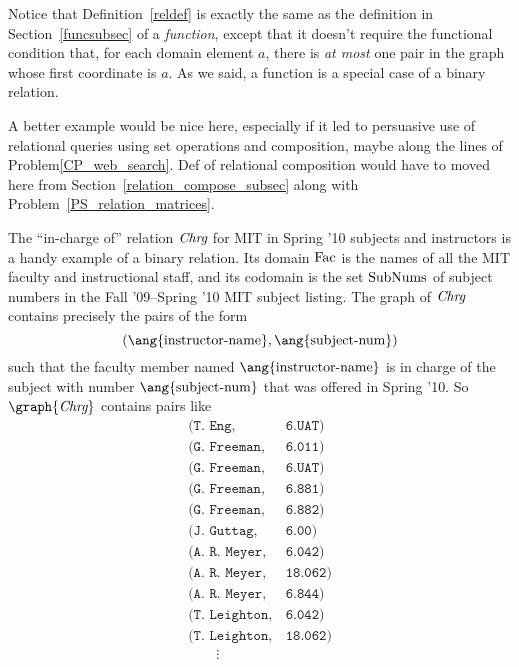 Notice that Definition~\ref{reldef} is exactly the same as the definition
in Section~\ref{funcsubsec} of a \emph{function}, except that it doesn't
require the functional condition that, for each domain element $a$, there
is \emph{at most} one pair in the graph whose first coordinate is $a$.  As
we said, a function is a special case of a binary relation.

\begin{editingnotes}
A better example would be nice here, especially if it led to
persuasive use of relational queries using set operations and
composition, maybe along the lines of Problem\ref{CP_web_search}.
Def of relational composition would have to moved here from
Section~\ref{relation_compose_subsec} along with
Problem~\ref{PS_relation_matrices}.
\end{editingnotes}

The ``in-charge of'' relation $\textit{Chrg}$ for MIT in Spring '10 subjects
and instructors is a handy example of a binary relation.  Its domain
$\text{Fac}$ is the names of all the MIT faculty and instructional staff,
and its codomain is the set $\text{SubNums}$ of subject numbers in the
Fall '09--Spring '10 MIT subject listing.  The graph of $\textit{Chrg}$ contains
precisely the pairs of the form
\[
(\ang{\text{instructor-name}}, \ang{\text{subject-num}})
\]
such that the faculty member named $\ang{\text{instructor-name}}$ is in
charge of the subject with number $\ang{\text{subject-num}}$ that was
offered in Spring '10.  So $\graph{\inchrg}$ contains pairs like
\begin{equation}\label{incharge-pairs}
\begin{array}{ll}
  (\texttt{T. Eng},     & \texttt{6.UAT})\\
  (\texttt{G. Freeman}, & \texttt{6.011})\\
  (\texttt{G. Freeman}, & \texttt{6.UAT})\\
  (\texttt{G. Freeman}, & \texttt{6.881})\\
  (\texttt{G. Freeman}, & \texttt{6.882})\\
  (\texttt{J. Guttag},  & \texttt{6.00})\\
  (\texttt{A. R. Meyer}, & \texttt{6.042})\\
  (\texttt{A. R. Meyer}, & \texttt{18.062})\\
  (\texttt{A. R. Meyer}, & \texttt{6.844})\\
  (\texttt{T. Leighton}, & \texttt{6.042})\\
  (\texttt{T. Leighton}, & \texttt{18.062})\\
  \qquad \vdots
\end{array}
\end{equation}

